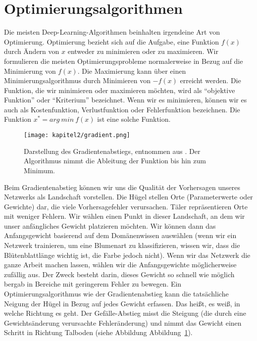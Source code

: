 \section{Optimierungsalgorithmen}
Die meisten Deep-Learning-Algorithmen beinhalten irgendeine Art von Optimierung. Optimierung bezieht sich auf die Aufgabe, eine Funktion $f(x)$ durch Ändern von $x$ entweder zu minimieren oder zu maximieren. Wir formulieren die meisten Optimierungsprobleme normalerweise in Bezug auf die Minimierung von $f(x)$. Die Maximierung kann über einen Minimierungsalgorithmus durch Minimieren von $-$$f(x)$ erreicht werden. Die Funktion, die wir minimieren oder maximieren möchten, wird als \enquote{objektive Funktion} oder \enquote{Kriterium} bezeichnet. Wenn wir es minimieren, können wir es auch als Kostenfunktion, Verlustfunktion oder Fehlerfunktion bezeichnen. Die Funktion $x^{*} = arg\ min\ f( x)$ ist eine solche Funktion.

        \begin{figure}[H]
            \centering
            \texttt{[image: kapitel2/gradient.png]}
            \caption[Der Gradientenabstieg]{Darstellung des Gradientenabstiegs, entnommen aus \cite*{IanGoodfellowYoshuaBengio2016}. Der Algorithmus nimmt die Ableitung der Funktion bis hin zum Minimum.}
            \label{Kap2:Grad}
        \end{figure}

        Beim Gradientenabstieg können wir uns die Qualität der Vorhersagen unseres Netzwerks als Landschaft vorstellen. Die Hügel stellen Orte (Parameterwerte oder Gewichte) dar, die viele Vorhersagefehler verursachen. Täler repräsentieren Orte mit weniger Fehlern. Wir wählen einen Punkt in dieser Landschaft, an dem wir unser anfängliches Gewicht platzieren möchten. Wir können dann das Anfangsgewicht basierend auf dem Domänenwissen auswählen (wenn wir ein Netzwerk trainieren, um eine Blumenart zu klassifizieren, wissen wir, dass die Blütenblattlänge wichtig ist, die Farbe jedoch nicht). Wenn wir das Netzwerk die ganze Arbeit machen lassen, wählen wir die Anfangsgewichte möglicherweise zufällig aus. Der Zweck besteht darin, dieses Gewicht so schnell wie möglich bergab in Bereiche mit geringerem Fehler zu bewegen. Ein Optimierungsalgorithmus wie der Gradientenabstieg kann die tatsächliche Neigung der Hügel in Bezug auf jedes Gewicht erfassen. Das heißt, es weiß, in welche Richtung es geht. Der Gefälle-Abstieg misst die Steigung (die durch eine Gewichtsänderung verursachte Fehleränderung) und nimmt das Gewicht einen Schritt in Richtung Talboden \cite*[34]{Patterson2019} (siehe Abbildung Abbildung~\ref{Kap2:Grad}).

